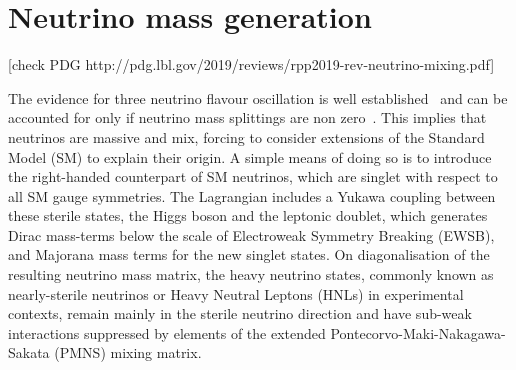 \chapter{Neutrino mass generation}
\label{sec:neutrino_mass}

[check PDG http://pdg.lbl.gov/2019/reviews/rpp2019-rev-neutrino-mixing.pdf]

The evidence for three neutrino flavour oscillation is well established~\cite{Fukuda:1998mi,Aharmim:2005gt} %
and can be accounted for only if neutrino mass splittings are non zero~\cite{nufit}.
This implies that neutrinos are massive and mix, forcing to consider extensions %
of the Standard Model (SM) to explain their origin. 
A simple means of doing so is to introduce the right-handed counterpart of SM neutrinos, which are %
singlet with respect to all SM gauge symmetries.
The Lagrangian includes a Yukawa coupling between these sterile states, the Higgs boson and the leptonic doublet, %
which generates Dirac mass-terms below the scale of Electroweak Symmetry Breaking (EWSB), 
and Majorana mass terms for the new singlet states.
On diagonalisation of the resulting neutrino mass matrix, the heavy neutrino states, %
commonly known as nearly-sterile neutrinos or Heavy Neutral Leptons (HNLs) in experimental contexts, %
remain mainly in the sterile neutrino direction and have sub-weak interactions suppressed by %
elements of the extended Pontecorvo-Maki-Nakagawa-Sakata (PMNS) mixing matrix. 

